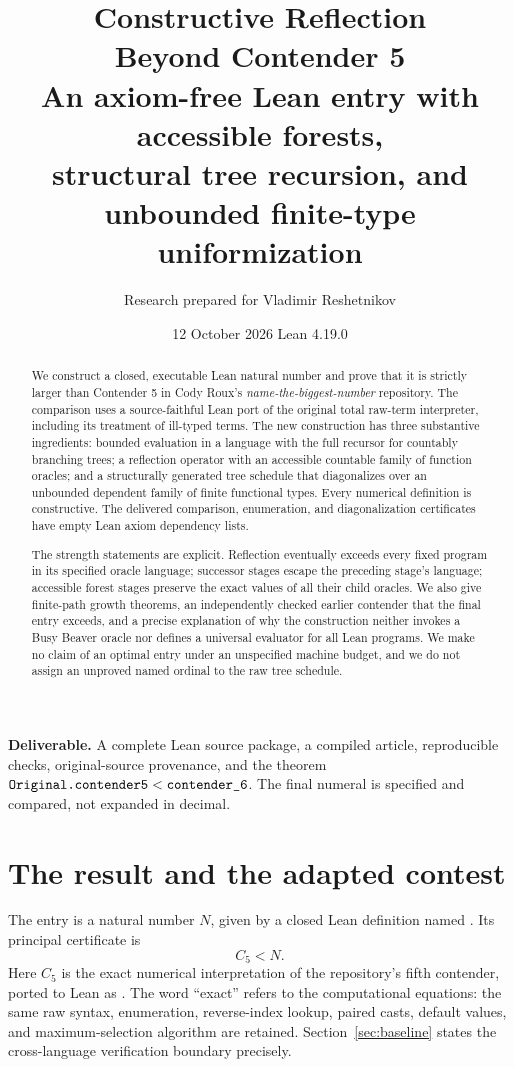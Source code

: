 \documentclass[11pt,a4paper]{article}
\title{\vspace{-12mm}\textbf{\color{navy}Constructive Reflection\\Beyond Contender 5}\\[6pt]
  \large An axiom-free Lean entry with accessible forests,\\
  structural tree recursion, and unbounded finite-type uniformization}
\author{Research prepared for Vladimir Reshetnikov}
\date{12 October 2026 \quad\textbar\quad Lean 4.19.0}
\theoremstyle{definition}
\newcommand{\code}[1]{\texttt{\detokenize{#1}}}
\begin{document}
\maketitle
\begin{abstract}
We construct a closed, executable Lean natural number and prove that it is
strictly larger than Contender 5 in Cody Roux's \emph{name-the-biggest-number}
repository. The comparison uses a source-faithful Lean port of the original
total raw-term interpreter, including its treatment of ill-typed terms. The
new construction has three substantive ingredients: bounded evaluation in a
language with the full recursor for countably branching trees; a reflection
operator with an accessible countable family of function oracles; and a
structurally generated tree schedule that diagonalizes over an unbounded
dependent family of finite functional types. Every numerical definition is
constructive. The delivered comparison, enumeration, and diagonalization
certificates have empty Lean axiom dependency lists.

The strength statements are explicit. Reflection eventually exceeds every
fixed program in its specified oracle language; successor stages escape the
preceding stage's language; accessible forest stages preserve the exact
values of all their child oracles. We also give finite-path growth theorems,
an independently checked earlier contender that the final entry exceeds,
and a precise explanation of why the construction neither invokes a Busy
Beaver oracle nor defines a universal evaluator for all Lean programs. We
make no claim of an optimal entry under an unspecified machine budget, and
we do not assign an unproved named ordinal to the raw tree schedule.
\end{abstract}

\vspace{2mm}
\noindent\colorbox{pale}{\parbox{\dimexpr\linewidth-2\fboxsep\relax}{
\textbf{Deliverable.} A complete Lean source package, a compiled article,
reproducible checks, original-source provenance, and the theorem
\(\code{Original.contender5}<\code{contender_6}\).
The final numeral is specified and compared, not expanded in decimal.}}

\newpage
\tableofcontents
\newpage

\section{The result and the adapted contest}
\label{sec:rules}

The entry is a natural number \(N\), given by a closed Lean definition named
\code{contender_6}. Its principal certificate is
\[
                 \boxed{C_5<N.}
\]
Here \(C_5\) is the exact numerical interpretation of the repository's fifth
contender, ported to Lean as \code{Original.contender5}. The word ``exact''
refers to the computational equations: the same raw syntax, enumeration,
reverse-index lookup, paired casts, default values, and maximum-selection
algorithm are retained. Section~\ref{sec:baseline} states the cross-language
verification boundary precisely.
\end{document}
